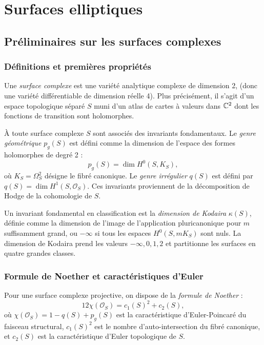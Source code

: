 \chapter{Surfaces elliptiques}

\section{Préliminaires sur les surfaces complexes}

\subsection{Définitions et premières propriétés}

Une \emph{surface complexe} est une variété analytique complexe de dimension 2, (donc une variété différentiable de dimension réelle 4). Plus précisément, il s'agit d'un espace topologique séparé $S$ muni d'un atlas de cartes à valeurs dans $\mathbb{C}^2$ dont les fonctions de transition sont holomorphes.

À toute surface complexe $S$ sont associés des invariants fondamentaux. Le \emph{genre géométrique} $p_g(S)$ est défini comme la dimension de l'espace des formes holomorphes de degré 2 :
\[
p_g(S) = \dim H^0(S, K_S),
\]
où $K_S = \Omega_S^2$ désigne le fibré canonique. Le \emph{genre irrégulier} $q(S)$ est défini par $q(S) = \dim H^1(S, \mathcal{O}_S)$. Ces invariants proviennent de la décomposition de Hodge de la cohomologie de $S$.

Un invariant fondamental en classification est la \emph{dimension de Kodaira} $\kappa(S)$, définie comme la dimension de l'image de l'application pluricanonique pour $m$ suffisamment grand, ou $-\infty$ si tous les espaces $H^0(S, mK_S)$ sont nuls. La dimension de Kodaira prend les valeurs $-\infty, 0, 1, 2$ et partitionne les surfaces en quatre grandes classes.

\subsection{Formule de Noether et caractéristiques d'Euler}

Pour une surface complexe projective, on dispose de la \emph{formule de Noether} :
\[
12 \chi(\mathcal{O}_S) = c_1(S)^2 + c_2(S),
\]
où $\chi(\mathcal{O}_S) = 1 - q(S) + p_g(S)$ est la caractéristique d'Euler-Poincaré du faisceau structural, $c_1(S)^2$ est le nombre d'auto-intersection du fibré canonique, et $c_2(S)$ est la caractéristique d'Euler topologique de $S$.

